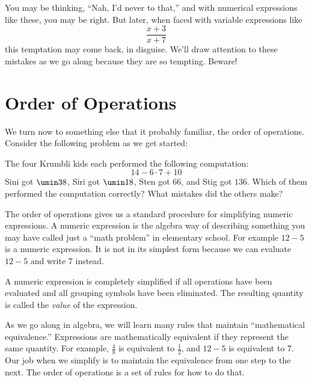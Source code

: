 You may be thinking, ``Nah, I'd never to that,'' and with numerical expressions like these, you may be right. But later, when faced with variable expressions like \[\frac{x+3}{x+7}\]
this temptation may come back, in disguise. We'll draw attention to these \evilandwrong{} mistakes as we go along because they are so tempting. Beware!


\section{Order of Operations}
\label{sec:orderofops}

We turn now to something else that it probably familiar, the \gls{order of operations}. Consider the following problem as we get started:

\begin{boxedexplore}
The four Krumbli kids each performed the following computation: \[14 - 6 \cdot 7 + 10\] Sini got $\umin38$,
Siri got $\umin18$,
Sten got $66$,
and Stig got $136$. Which of them performed the computation correctly? What mistakes did the others make?
\end{boxedexplore}

The order of operations gives us a standard procedure for simplifying numeric expressions. A \gls{numeric expression} is the algebra way of describing something you may have called just a ``math problem'' in elementary school. For example $12 - 5$ is a numeric expression. It is not in its simplest form because we can evaluate $12 - 5$ and write 7 instead.  

\begin{boxedcriteria}
A numeric expression is completely simplified if all operations have been evaluated and all grouping symbols have been eliminated. The resulting quantity is called the \textit{value} of the expression.
\end{boxedcriteria}

As we go along in algebra, we will learn many rules that maintain ``mathematical equivalence.''  Expressions are mathematically equivalent if they represent the same quantity.  For example, $\frac{4}{8}$ is equivalent to $\frac{1}{2}$, and $12 - 5$ is equivalent to 7. Our job when we simplify is to maintain the equivalence from one step to the next. The order of operations is a set of rules for how to do that.

